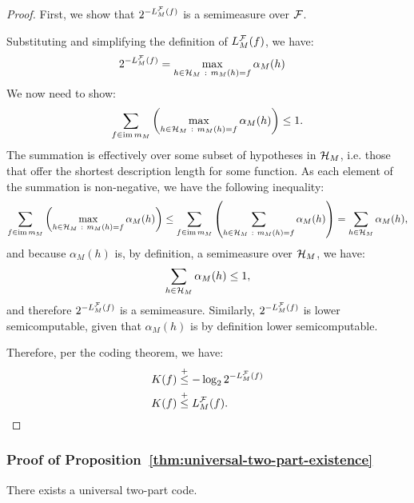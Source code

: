 \begin{proof}
First, we show that $2^{-L^{\mathcal{F}}_M(f)}$ is a semimeasure over ${\mathcal{F}}$.

Substituting and simplifying the definition of $L^{\mathcal{F}}_M(f)$, we have:
\begin{align}
    2^{-L^{\mathcal{F}}_M(f)} &= \max_{h \in {\mathcal{H}}_{M}  ~:~ m_M(h)=f} \alpha_M(h)
\end{align}
We now need to show:
\begin{align}
    \sum_{f \in \operatorname{im}{m_M}} \left( \max_{h \in {\mathcal{H}}_{M}  ~:~ m_M(h)=f} \alpha_M(h) \right) \leq 1.
\end{align}
The summation is effectively over some subset of hypotheses in ${\mathcal{H}}_M$, i.e. those that offer the shortest description length for some function. As each element of the summation is non-negative, we have the following inequality:
\begin{align*}
    \sum_{f \in \operatorname{im}{m_M}} \left( \max_{h \in {\mathcal{H}}_{M}  ~:~ m_M(h)=f} \alpha_M(h) \right) \leq \sum_{f \in \operatorname{im}{m_M}} \left( \sum_{h \in {\mathcal{H}}_{M}  ~:~ m_M(h)=f} \alpha_M(h) \right) = \sum_{h \in {\mathcal{H}}_M} \alpha_M(h),
\end{align*}
and because $\alpha_M(h)$ is, by definition, a semimeasure over ${\mathcal{H}}_M$, we have:
\begin{align*}
    \sum_{h \in {\mathcal{H}}_M} \alpha_M(h) \leq 1,
\end{align*}
and therefore $2^{-L^{\mathcal{F}}_M(f)}$ is a semimeasure. Similarly, $2^{-L^{\mathcal{F}}_M(f)}$ is lower semicomputable, given that $\alpha_M(h)$ is by definition lower semicomputable.

Therefore, per the coding theorem, we have:
\begin{align*}
    K(f) &\leqc -\log_2 2^{-L^\gF_M(f)} \\
      K(f) &\leqc L^\gF_M(f). \qedhere
\end{align*} 
\end{proof}


\subsubsection{Proof of Proposition~\ref{thm:universal-two-part-existence}}
\label{sec:app-proof-of-universal-two-part-existence}

\begin{prop*} There exists a universal two-part code.
\end{prop*}


